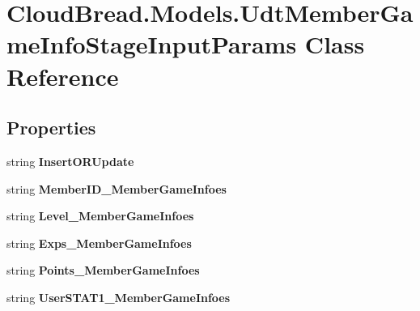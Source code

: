 \hypertarget{a00111}{}\section{Cloud\+Bread.\+Models.\+Udt\+Member\+Game\+Info\+Stage\+Input\+Params Class Reference}
\label{a00111}
\subsection*{Properties}
\begin{DoxyCompactItemize}
\item 
string {\bfseries Insert\+O\+R\+Update}\hypertarget{a00111_adf0fa026ec163bb0aaf8b9fa20acc700}{}\label{a00111_adf0fa026ec163bb0aaf8b9fa20acc700}

\item 
string {\bfseries Member\+I\+D\+\_\+\+Member\+Game\+Infoes}\hypertarget{a00111_a7d6a1a381a81a28c55a547d2c4464b4c}{}\label{a00111_a7d6a1a381a81a28c55a547d2c4464b4c}

\item 
string {\bfseries Level\+\_\+\+Member\+Game\+Infoes}\hypertarget{a00111_a0d7967400a27e487f84935c3ad605a7a}{}\label{a00111_a0d7967400a27e487f84935c3ad605a7a}

\item 
string {\bfseries Exps\+\_\+\+Member\+Game\+Infoes}\hypertarget{a00111_a5c1e60a91db30a360a7554dcb3f443a0}{}\label{a00111_a5c1e60a91db30a360a7554dcb3f443a0}

\item 
string {\bfseries Points\+\_\+\+Member\+Game\+Infoes}\hypertarget{a00111_a941273b24db8b5c40388ed058291a49c}{}\label{a00111_a941273b24db8b5c40388ed058291a49c}

\item 
string {\bfseries User\+S\+T\+A\+T1\+\_\+\+Member\+Game\+Infoes}\hypertarget{a00111_a8a82638556b8440591dd6931629d7587}{}\label{a00111_a8a82638556b8440591dd6931629d7587}


\end{DoxyCompactItemize}
